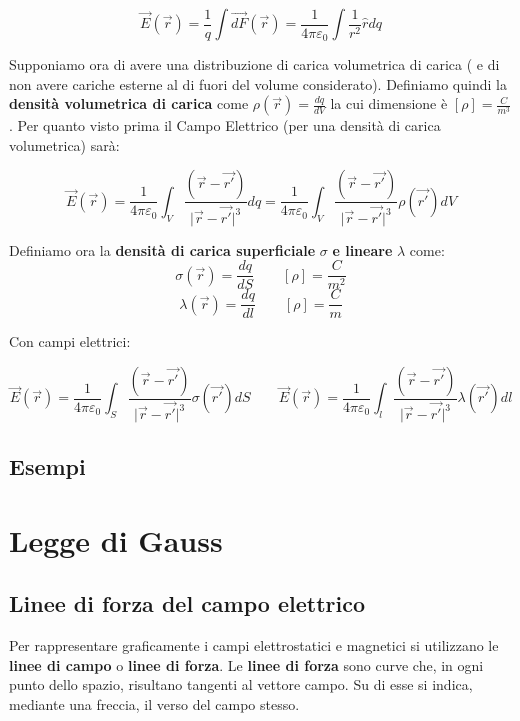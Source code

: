 \documentclass{book}
\begin{document}
\[
\vec{E}(\vec{r})=\frac{1}{q}\int \vec{dF}(\vec{r})=  \frac{1}{4\pi\varepsilon_0} \int \frac{1}{r^2}\hat{r}dq
\]

Supponiamo ora di avere una distribuzione di carica volumetrica di carica ( e di non avere cariche esterne al di fuori del volume considerato).
Definiamo quindi la \textbf{densità volumetrica di carica} come $\rho(\vec{r})=\frac{dq}{dV} $
la cui dimensione è $[\rho]=\frac{C}{m^3}$.
Per quanto visto prima il Campo Elettrico (per una densità di carica volumetrica) sarà:

\[
\vec{E}(\vec{r})=\frac{1}{4\pi\varepsilon_0} \int_{V} \frac{(\vec{r} - \vec{r'} )}{ \lvert{\vec{r} - \vec{r'} } \rvert ^3}dq = \frac{1}{4\pi\varepsilon_0} \int_{V} \frac{(\vec{r} - \vec{r'} ) }{ \lvert{\vec{r} - \vec{r'} } \rvert ^3}\rho(\vec{r'}) dV
\]

Definiamo ora la \textbf{densità di carica superficiale} $\sigma$ \textbf{e lineare} $\lambda$ come: 
\[
\sigma(\vec{r}) = \frac{dq}{dS} 
\qquad 
[\rho] = \frac{C}{m^2}
\]
\[
\lambda(\vec{r}) = \frac{dq}{dl} 
\qquad 
[\rho] = \frac{C}{m}
\]

Con campi elettrici: 

\[
\vec{E}(\vec{r}) = \frac{1}{4\pi\varepsilon_0} \int_{S} \frac{(\vec{r} - \vec{r'} ) }{ \lvert{\vec{r} - \vec{r'} } \rvert ^3}\sigma(\vec{r'}) dS
\qquad 
\vec{E}(\vec{r}) = \frac{1}{4\pi\varepsilon_0} \int_{l} \frac{(\vec{r} - \vec{r'} ) }{ \lvert{\vec{r} - \vec{r'} } \rvert ^3}\lambda(\vec{r'}) dl
\]

\section{Esempi}


\chapter{Legge di Gauss}
\section{Linee di forza del campo elettrico}

Per rappresentare graficamente i campi elettrostatici e magnetici si utilizzano le \textbf{linee di campo} o \textbf{linee di forza}.  
Le \textbf{linee di forza} sono curve che, in ogni punto dello spazio, risultano tangenti al vettore campo. Su di esse si indica, mediante una freccia, il verso del campo stesso.  

\bigskip
\end{document}
